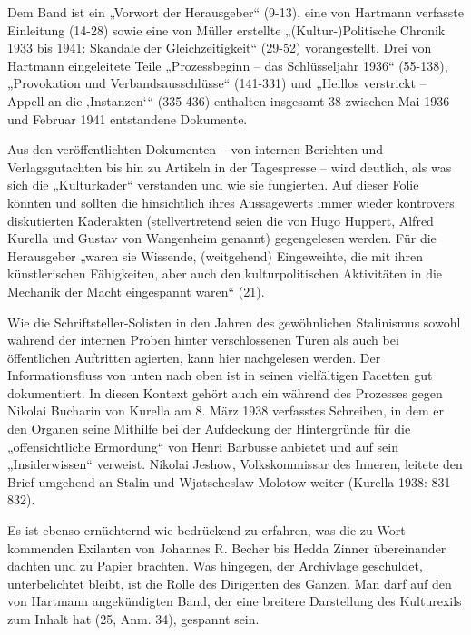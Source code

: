 \begin{multicols*}{2}
Dem Band ist ein „Vorwort der Herausgeber“ (9-13), eine von Hartmann verfasste Einleitung (14-28) sowie eine von Müller erstellte „(Kultur-)Politische Chronik 1933 bis 1941: Skandale der Gleichzeitigkeit“ (29-52) vorangestellt. Drei von Hartmann eingeleitete Teile „Prozessbeginn – das Schlüsseljahr 1936“ (55-138), „Provokation und Verbandsausschlüsse“ (141-331) und „Heillos verstrickt – Appell an die ‚Instanzen‘“ (335-436) enthalten insgesamt 38 zwischen Mai 1936 und Februar 1941 entstandene Dokumente.

Aus den veröffentlichten Dokumenten – von internen Berichten und Verlagsgutachten bis hin zu Artikeln in der Tagespresse – wird deutlich, als was sich die „Kulturkader“ verstanden und wie sie fungierten. Auf dieser Folie könnten und sollten die hinsichtlich ihres Aussagewerts immer wieder kontrovers diskutierten Kaderakten (stellvertretend seien die von Hugo Huppert, Alfred Kurella und Gustav von Wangenheim genannt) gegengelesen werden. Für die Herausgeber „waren sie Wissende, (weitgehend) Eingeweihte, die mit ihren künstlerischen Fähigkeiten, aber auch den kulturpolitischen Aktivitäten in die Mechanik der Macht eingespannt waren“ (21).

Wie die Schriftsteller-Solisten in den Jahren des gewöhnlichen Stalinismus sowohl während der internen Proben hinter verschlossenen Türen als auch bei öffentlichen Auftritten agierten, kann hier nachgelesen werden. Der Informationsfluss von unten nach oben ist in seinen vielfältigen Facetten gut dokumentiert. In diesen Kontext gehört auch ein während des Prozesses gegen Nikolai Bucharin von Kurella am 8. März 1938 verfasstes Schreiben, in dem er den Organen seine Mithilfe bei der Aufdeckung der Hintergründe für die „offensichtliche Ermordung“ von Henri Barbusse anbietet und auf sein „Insiderwissen“ verweist. Nikolai Jeshow, Volkskommissar des Inneren, leitete den Brief umgehend an Stalin und Wjatscheslaw Molotow weiter (Kurella 1938: 831-832).

Es ist ebenso ernüchternd wie bedrückend zu erfahren, was die zu Wort kommenden Exilanten von Johannes R. Becher bis Hedda Zinner übereinander dachten und zu Papier brachten. Was hingegen, der Archivlage geschuldet, unterbelichtet bleibt, ist die Rolle des Dirigenten des Ganzen. Man darf auf den von Hartmann angekündigten Band, der eine breitere Darstellung des Kulturexils zum Inhalt hat (25, Anm. 34), gespannt sein.


\end{multicols*}
